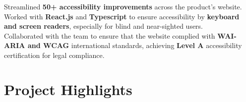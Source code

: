 \documentclass[]{Nikhil_Kadiyan_Resume}
\begin{document}
\pt Streamlined \textbf{50+ accessibility improvements} across the product's website.\\
\pt Worked with \textbf{React.js} and \textbf{Typescript} to ensure accessibility by \textbf{keyboard and screen readers}, especially for blind and near-sighted users.\\
\pt Collaborated with the team to ensure that the website complied with \textbf{WAI-ARIA and WCAG} international standards, achieving \textbf{Level A} accessibility certification for legal compliance.\\
\sectionsep



\section{Project Highlights}
\hrulefill


\end{document}
